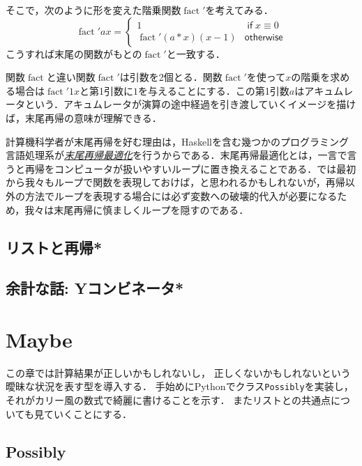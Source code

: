 \documentclass[a5paper,draft]{jsbook}
\newcommand{\programminglanguage}[1]{\textsf{#1}}
\newcommand{\haskell}{\programminglanguage{Haskell}}
\newcommand{\python}{\programminglanguage{Python}}
\newenvironment{leader}{\begingroup}{\endgroup}
\newcommand{\keyword}[1]{{\underline{\emph{#1}}}}
\newcommand{\code}[1]{\texttt{#1}}
\DeclareMathOperator{\mathFactorial}{fact}
\newcommand{\mathKeyword}[1]{\operatorname{\textsf{#1}}}
\newcommand{\mathIf}{\mathKeyword{if}}
\newcommand{\mathOtherwise}{\mathKeyword{otherwise}}
\begin{document}
そこで，次のように形を変えた階乗関数$\mathFactorial'$を考えてみる．
\begin{equation}
\mathFactorial'ax=\begin{cases}
1&\mathIf x\equiv0\\
\mathFactorial'(a*x)(x-1)&\mathOtherwise
\end{cases}
\end{equation}
こうすれば末尾の関数がもとの$\mathFactorial'$と一致する．

関数$\mathFactorial$と違い関数$\mathFactorial'$は引数を2個とる．関数$\mathFactorial'$を使って$x$の階乗を求める場合は$\mathFactorial'1x$と第1引数に$1$を与えることにする．この第1引数$a$はアキュムレータという．アキュムレータが演算の途中経過を引き渡していくイメージを描けば，末尾再帰の意味が理解できる．

計算機科学者が末尾再帰を好む理由は，\haskell を含む幾つかのプログラミング言語処理系が\keyword{末尾再帰最適化}を行うからである．末尾再帰最適化とは，一言で言うと再帰をコンピュータが扱いやすいループに置き換えることである．では最初から我々もループで関数を表現しておけば，と思われるかもしれないが，再帰以外の方法でループを表現する場合には必ず変数への破壊的代入が必要になるため，我々は末尾再帰に慎ましくループを隠すのである．

\section{リストと再帰*}

\section{余計な話: Yコンビネータ*}


\chapter{Maybe}

\begin{leader}
この章では計算結果が正しいかもしれないし，
正しくないかもしれないという曖昧な状況を表す型を導入する．
手始めに\python でクラス\code{Possibly}を実装し，
それがカリー風の数式で綺麗に書けることを示す．
またリストとの共通点についても見ていくことにする．
\end{leader}

\section{Possibly}
\end{document}
